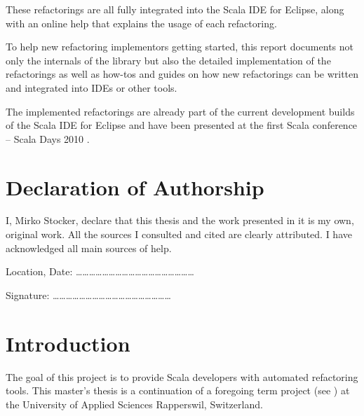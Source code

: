 \documentclass[10pt,a4paper,oneside]{scrreprt}
\begin{document}
These refactorings are all fully integrated into the Scala IDE for Eclipse, along with an online help that explains the usage of each refactoring.

To help new refactoring implementors getting started, this report documents not only the internals of the library but also the detailed implementation of the refactorings as well as how-tos and guides on how new refactorings can be written and integrated into IDEs or other tools.

The implemented refactorings are already part of the current development builds of the Scala IDE for Eclipse and have been presented at the first Scala conference -- Scala Days 2010 \cite{ScalaDaysRefactoring}.

\newpage

\chapter*{Declaration of Authorship}

I, Mirko Stocker, declare that this thesis and the work presented in it is my own, original work. All the sources I consulted and cited are clearly attributed. I have acknowledged all main sources of help.

\vspace{3cm}

\noindent Location, Date: \hspace{1cm} \ldots\ldots\ldots\ldots\ldots\ldots\ldots\ldots\ldots\ldots\ldots\ldots\ldots\ldots\ldots\ldots\ldots\ldots \\

\vspace{1.5cm}

\noindent Signature: \hspace{1.77cm} \ldots\ldots\ldots\ldots\ldots\ldots\ldots\ldots\ldots\ldots\ldots\ldots\ldots\ldots\ldots\ldots\ldots\ldots

\emptypage

\newpage

\setcounter{tocdepth}{2}

\tableofcontents

\emptypage
\newpage
{}

\chapter{Introduction} \label{chapter:introduction}

The goal of this project is to provide Scala developers with automated refactoring tools. This master's thesis is a continuation of a foregoing term project (see \cite{ScalaRefactoring}) at the University of Applied Sciences Rapperswil, Switzerland. 
\end{document}
